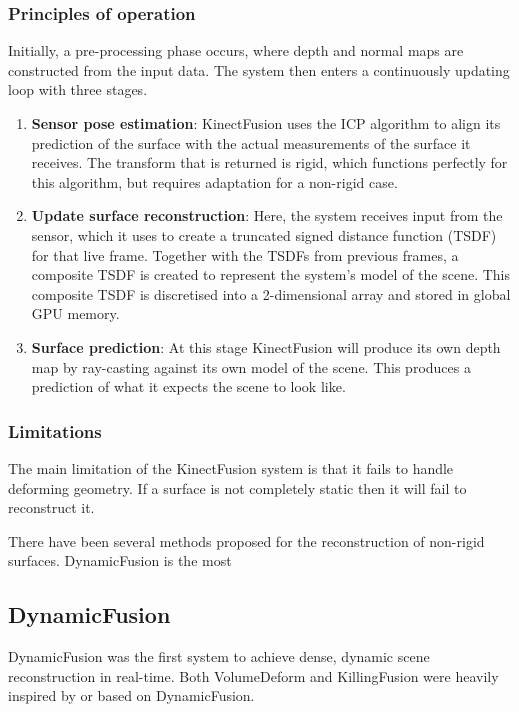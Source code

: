 \documentclass[a4paper]{article}
\begin{document}
\subsubsection{Principles of operation}

Initially, a pre-processing phase occurs, where depth and normal maps are constructed from the input data. The system then enters a continuously updating loop with three stages.

\begin{enumerate}
\item \textbf{Sensor pose estimation}: KinectFusion uses the ICP algorithm to align its prediction of the surface with the actual measurements of the surface it receives. The transform that is returned is rigid, which functions perfectly for this algorithm, but requires adaptation for a non-rigid case. 

\item \textbf{Update surface reconstruction}: Here, the system receives input from the sensor, which it uses to create a truncated signed distance function (TSDF) for that live frame. Together with the TSDFs from previous frames, a composite TSDF is created to represent the system's model of the scene. This composite TSDF is discretised into a 2-dimensional array and stored in global GPU memory.

\item \textbf{Surface prediction}: At this stage KinectFusion will produce its own depth map by ray-casting against its own model of the scene. This produces a prediction of what it expects the scene to look like. 
\end{enumerate}


\subsubsection{Limitations}

The main limitation of the KinectFusion system is that it fails to handle deforming geometry. If a surface is not completely static then it will fail to reconstruct it.  


There have been several methods proposed for the reconstruction of non-rigid surfaces. DynamicFusion is the most 

\newpage
\subsection{DynamicFusion}

DynamicFusion\cite{dynamicfusion} was the first system to achieve dense, dynamic scene reconstruction in real-time. Both VolumeDeform and KillingFusion were heavily inspired by or based on DynamicFusion.
\end{document}
